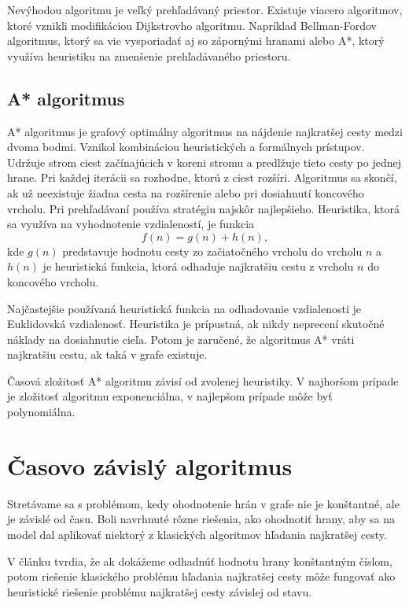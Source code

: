Nevýhodou algoritmu je veľký prehľadávaný priestor. Existuje viacero algoritmov, ktoré vznikli modifikáciou Dijkstrovho algoritmu. Napríklad Bellman-Fordov algoritmus, ktorý sa vie vysporiadať aj so zápornými hranami alebo A*, ktorý využíva heuristiku na zmenšenie prehľadávaného priestoru. 

\subsection{A* algoritmus}
A* algoritmus je grafový optimálny algoritmus na nájdenie najkratšej cesty medzi dvoma bodmi. Vznikol kombináciou heuristických a formálnych prístupov. Udržuje strom ciest začínajúcich v koreni stromu a predlžuje tieto cesty po jednej hrane. Pri každej iterácii sa rozhodne, ktorú z ciest rozšíri. Algoritmus sa skončí, ak už neexistuje žiadna cesta na rozšírenie alebo pri dosiahnutí koncového vrcholu. Pri prehľadávaní používa stratégiu najskôr najlepšieho. Heuristika, ktorá sa využíva na vyhodnotenie vzdialeností, je funkcia
\begin{equation}
f(n) = g(n) + h(n), 
\end{equation}
kde $g(n)$ predstavuje hodnotu cesty zo začiatočného vrcholu do vrcholu $n$ a $h(n)$ je heuristická funkcia, ktorá odhaduje najkratšiu cestu z vrcholu $n$ do koncového vrcholu.

Najčastejšie používaná heuristická funkcia na odhadovanie vzdialenosti je Euklidovská vzdialenosť.
Heuristika je prípustná, ak nikdy neprecení skutočné náklady na dosiahnutie cieľa. Potom je zaručené, že algoritmus A* vráti najkratšiu cestu, ak taká v grafe existuje.

Časová zložitosť A* algoritmu závisí od zvolenej heuristiky. V najhoršom prípade je zložitosť algoritmu exponenciálna, v najlepšom prípade môže byť polynomiálna.

\section{Časovo závislý algoritmus}
Stretávame sa s problémom, kedy ohodnotenie hrán v grafe nie je konštantné, ale je závislé od času. Boli navrhnuté rôzne riešenia, ako ohodnotiť hrany, aby sa na model dal aplikovať niektorý z klasických algoritmov hľadania najkratšej cesty. 

V článku \cite{trains} tvrdia, že ak dokážeme odhadnúť hodnotu hrany konštantným číslom, potom riešenie klasického problému hľadania najkratšej cesty môže fungovať ako heuristické riešenie problému najkratšej cesty závislej od stavu.

